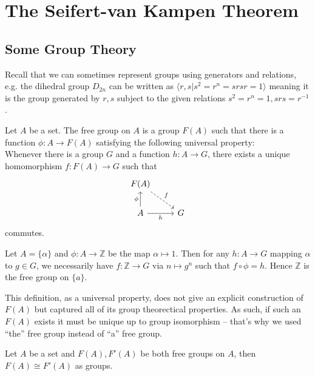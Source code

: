 \section{The Seifert-van Kampen Theorem}
\subsection{Some Group Theory}
Recall that we can sometimes represent groups using generators and relations, e.g. the dihedral group $D_{2n}$ can be written as $\langle r,s|s^2=r^n=srsr=1\rangle$ meaning it is the group generated by $r,s$ subject to the given relations $s^2=r^n=1,srs=r^{-1}$.
\begin{definition}
    Let $A$ be a set.
    The free group on $A$ is a group $F(A)$ such that there is a function $\phi:A\to F(A)$ satisfying the following universal property:\\
    Whenever there is a group $G$ and a function $h:A\to G$, there exists a unique homomorphism $f:F(A)\to G$ such that
    \[
        \begin{tikzcd}
            F(A)\arrow[dashed]{dr}{f}&\\
            A\arrow{u}{\phi} \arrow[swap]{r}{h}&G
        \end{tikzcd}
    \]
    commutes.
\end{definition}
\begin{example}
    Let $A=\{\alpha\}$ and $\phi:A\to\mathbb Z$ be the map $\alpha\mapsto 1$.
    Then for any $h:A\to G$ mapping $\alpha$ to $g\in G$, we necessarily have $f:\mathbb Z\to G$ via $n\mapsto g^n$ such that $f\circ\phi=h$.
    Hence $\mathbb Z$ is the free group on $\{a\}$.
\end{example}
\begin{remark}
    This definition, as a universal property, does not give an explicit construction of $F(A)$ but captured all of its group theorectical properties.
    As such, if such an $F(A)$ exists it must be unique up to group isomorphism -- that's why we used ``the'' free group instead of ``a'' free group.
\end{remark}
\begin{proposition}
    Let $A$ be a set and $F(A),F'(A)$ be both free groups on $A$, then $F(A)\cong F'(A)$ as groups.
\end{proposition}
